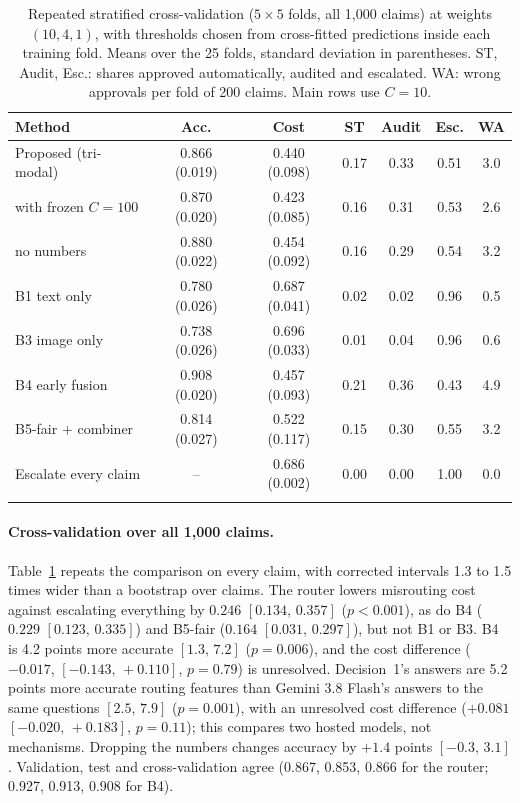 \begin{table}[!htb]
\caption{Repeated stratified cross-validation ($5\times5$ folds, all 1,000 claims) at weights $(10,4,1)$, with thresholds chosen from cross-fitted predictions inside each training fold. Means over the 25 folds, standard deviation in parentheses. ST, Audit, Esc.: shares approved automatically, audited and escalated. WA: wrong approvals per fold of 200 claims. Main rows use $C=10$.}\label{tab:cv}
\footnotesize
\begin{tabular*}{\textwidth}{@{\extracolsep{\fill}}lcccccc@{}}
\toprule
Method & Acc. & Cost & ST & Audit & Esc. & WA \\
\midrule
Proposed (tri-modal) & 0.866 (0.019) & 0.440 (0.098) & 0.17 & 0.33 & 0.51 & 3.0 \\
\quad with frozen $C=100$ & 0.870 (0.020) & 0.423 (0.085) & 0.16 & 0.31 & 0.53 & 2.6 \\
\quad no numbers & 0.880 (0.022) & 0.454 (0.092) & 0.16 & 0.29 & 0.54 & 3.2 \\
B1 text only & 0.780 (0.026) & 0.687 (0.041) & 0.02 & 0.02 & 0.96 & 0.5 \\
B3 image only & 0.738 (0.026) & 0.696 (0.033) & 0.01 & 0.04 & 0.96 & 0.6 \\
B4 early fusion & 0.908 (0.020) & 0.457 (0.093) & 0.21 & 0.36 & 0.43 & 4.9 \\
B5-fair + combiner & 0.814 (0.027) & 0.522 (0.117) & 0.15 & 0.30 & 0.55 & 3.2 \\
Escalate every claim & -- & 0.686 (0.002) & 0.00 & 0.00 & 1.00 & 0.0 \\
\botrule
\end{tabular*}
\end{table}

\paragraph{Cross-validation over all 1,000 claims.}
Table~\ref{tab:cv} repeats the comparison on every claim, with corrected intervals 1.3 to 1.5 times wider than a bootstrap over claims. The router lowers misrouting cost against escalating everything by $0.246$ $[0.134,\,0.357]$ ($p<0.001$), as do B4 ($0.229$ $[0.123,\,0.335]$) and B5-fair ($0.164$ $[0.031,\,0.297]$), but not B1 or B3. B4 is 4.2 points more accurate $[1.3,\,7.2]$ ($p=0.006$), and the cost difference ($-0.017$, $[-0.143,\,+0.110]$, $p=0.79$) is unresolved. Decision~1's answers are 5.2 points more accurate routing features than Gemini 3.8 Flash's answers to the same questions $[2.5,\,7.9]$ ($p=0.001$), with an unresolved cost difference ($+0.081$ $[-0.020,\,+0.183]$, $p=0.11$); this compares two hosted models, not mechanisms. Dropping the numbers changes accuracy by $+1.4$ points $[-0.3,\,3.1]$. Validation, test and cross-validation agree (0.867, 0.853, 0.866 for the router; 0.927, 0.913, 0.908 for B4).

